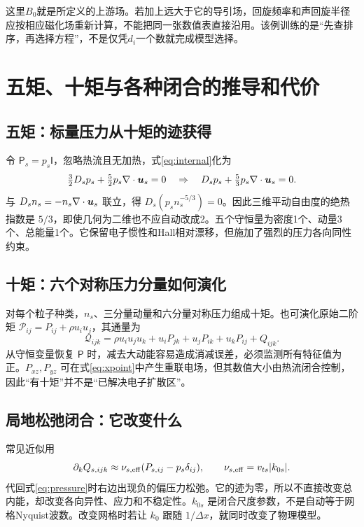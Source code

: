 \documentclass[UTF8,a4paper,11pt,openany,fontset=fandol]{ctexbook}
\begin{document}
这里$B_0$就是所定义的上游场。若加上远大于它的导引场，回旋频率和声回旋半径应按相应磁化场重新计算，不能把同一张数值表直接沿用。该例训练的是“先查排序，再选择方程”，不是仅凭$d_i$一个数就完成模型选择。


\section{五矩、十矩与各种闭合的推导和代价}
\subsection{五矩：标量压力从十矩的迹获得}
令 $\mathsf P_s=p_s\mathsf I$，忽略热流且无加热，式\eqref{eq:internal}化为
\begin{equation}\tfrac32D_sp_s+\tfrac52p_s\nabla\cdot\bm{u}_s=0
\quad\Rightarrow\quad D_sp_s+\tfrac53p_s\nabla\cdot\bm{u}_s=0.
\end{equation}
与 $D_sn_s=-n_s\nabla\cdot\bm{u}_s$ 联立，得 $D_s(p_sn_s^{-5/3})=0$。因此三维平动自由度的绝热指数是 $5/3$，即使几何为二维也不应自动改成2。五个守恒量为密度1个、动量3个、总能量1个。它保留电子惯性和Hall相对漂移，但施加了强烈的压力各向同性约束。

\subsection{十矩：六个对称压力分量如何演化}
对每个粒子种类，$n_s$、三分量动量和六分量对称压力组成十矩。也可演化原始二阶矩 $\mathcal P_{ij}=P_{ij}+\rho u_iu_j$，其通量为
\begin{equation}\mathcal Q_{ijk}=\rho u_iu_ju_k+u_iP_{jk}+u_jP_{ik}+u_kP_{ij}+Q_{ijk}.
\end{equation}
从守恒变量恢复 $\mathsf P$ 时，减去大动能容易造成消减误差，必须监测所有特征值为正。$P_{xz},P_{yz}$ 可在式\eqref{eq:xpoint}中产生重联电场，但其数值大小由热流闭合控制，因此“有十矩”并不是“已解决电子扩散区”。\citep{Wang2015}

\subsection{局地松弛闭合：它改变什么}
常见近似用
\begin{equation}\partial_kQ_{s,ijk}\approx\nu_{s,\rm eff}(P_{s,ij}-p_s\delta_{ij}),\qquad
\nu_{s,\rm eff}=v_{ts}|k_{0s}|.\label{eq:localclosure}
\end{equation}
代回式\eqref{eq:pressure}时右边出现负的偏压力松弛。它的迹为零，所以不直接改变总内能，却改变各向异性、应力和不稳定性。$k_{0s}$ 是闭合尺度参数，不是自动等于网格Nyquist波数。改变网格时若让 $k_0$ 跟随 $1/\Delta x$，就同时改变了物理模型。
\end{document}
